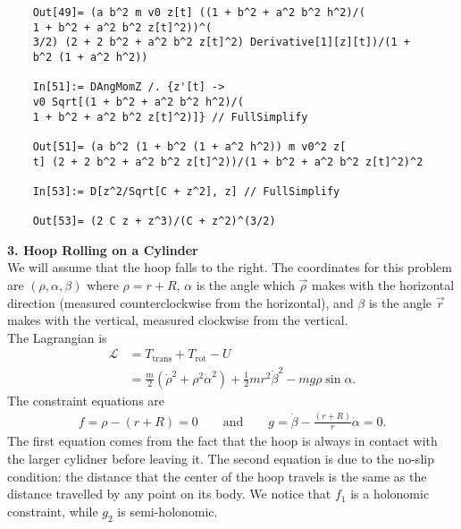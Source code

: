 \documentclass{article}
\theoremstyle{definition}
\newcommand{\lag}{\mathcal{L}}
\newcommand{\al}{\alpha}
\newcommand{\be}{\beta}
\newcommand{\f}[2]{\frac{#1}{#2}}
\newcommand{\lp}{\left(}
\newcommand{\rp}{\right)}
\begin{document}
\begin{enumerate}[label = (\alph*)]
\begin{lstlisting}
	Out[49]= (a b^2 m v0 z[t] ((1 + b^2 + a^2 b^2 h^2)/(
	1 + b^2 + a^2 b^2 z[t]^2))^(
	3/2) (2 + 2 b^2 + a^2 b^2 z[t]^2) Derivative[1][z][t])/(1 + 
	b^2 (1 + a^2 h^2))
	
	In[51]:= DAngMomZ /. {z'[t] -> 
	v0 Sqrt[(1 + b^2 + a^2 b^2 h^2)/(
	1 + b^2 + a^2 b^2 z[t]^2)]} // FullSimplify
	
	Out[51]= (a b^2 (1 + b^2 (1 + a^2 h^2)) m v0^2 z[
	t] (2 + 2 b^2 + a^2 b^2 z[t]^2))/(1 + b^2 + a^2 b^2 z[t]^2)^2
	
	In[53]:= D[z^2/Sqrt[C + z^2], z] // FullSimplify
	
	Out[53]= (2 C z + z^3)/(C + z^2)^(3/2)
	\end{lstlisting}
\end{enumerate} 

 



\noindent \textbf{3. Hoop Rolling on a Cylinder}\\


\noindent We will assume that the hoop falls to the right. The coordinates for this problem are $(\rho,\al,\be)$ where $\rho = r+R$, $\al$ is the angle which $\vec{\rho}$ makes with the horizontal direction (measured counterclockwise from the horizontal), and $\be$ is the angle $\vec{r}$ makes with the vertical, measured clockwise from the vertical.\\

The Lagrangian is 
\begin{align*}
\lag &= T_\text{trans} + T_\text{rot} - U\\
&= \f{m}{2}\lp \dot{\rho}^2 + \rho^2 \dot{\al}^2 \rp + \f{1}{2}mr^2 \dot\beta^2 - mg\rho \sin\al.
\end{align*}
The constraint equations are
\begin{align*}
f = \rho - (r+R) = 0 \quad\quad \text{and} \quad\quad g = \dot\beta - \f{(r+R)}{r}\dot{\al} = 0.
\end{align*}
The first equation comes from the fact that the hoop is always in contact with the larger cylidner before leaving it. The second equation is due to the no-slip condition: the distance that the center of the hoop travels is the same as the distance travelled by any point on its body. We notice that $f_1$ is a holonomic constraint, while $g_2$ is semi-holonomic.\\
\end{document}
